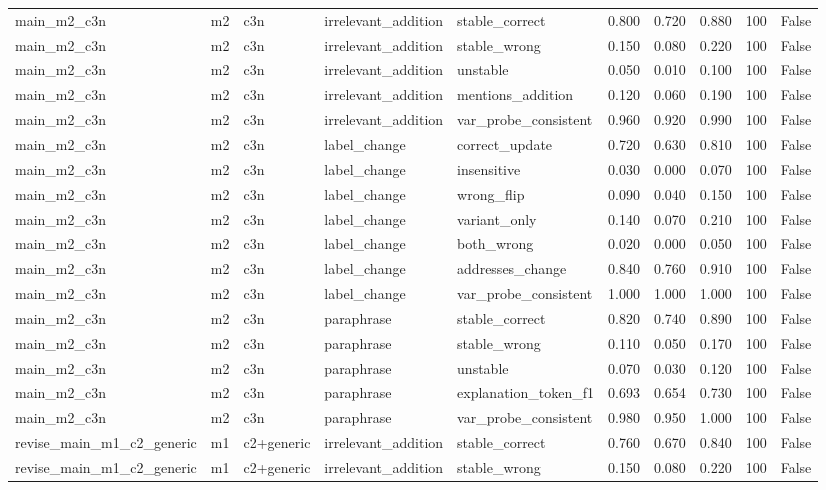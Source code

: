 \begin{tabular}{llllllllll}
main\_m2\_c3n & m2 & c3n & irrelevant\_addition & stable\_correct & 0.800 & 0.720 & 0.880 & 100 & False \\
main\_m2\_c3n & m2 & c3n & irrelevant\_addition & stable\_wrong & 0.150 & 0.080 & 0.220 & 100 & False \\
main\_m2\_c3n & m2 & c3n & irrelevant\_addition & unstable & 0.050 & 0.010 & 0.100 & 100 & False \\
main\_m2\_c3n & m2 & c3n & irrelevant\_addition & mentions\_addition & 0.120 & 0.060 & 0.190 & 100 & False \\
main\_m2\_c3n & m2 & c3n & irrelevant\_addition & var\_probe\_consistent & 0.960 & 0.920 & 0.990 & 100 & False \\
main\_m2\_c3n & m2 & c3n & label\_change & correct\_update & 0.720 & 0.630 & 0.810 & 100 & False \\
main\_m2\_c3n & m2 & c3n & label\_change & insensitive & 0.030 & 0.000 & 0.070 & 100 & False \\
main\_m2\_c3n & m2 & c3n & label\_change & wrong\_flip & 0.090 & 0.040 & 0.150 & 100 & False \\
main\_m2\_c3n & m2 & c3n & label\_change & variant\_only & 0.140 & 0.070 & 0.210 & 100 & False \\
main\_m2\_c3n & m2 & c3n & label\_change & both\_wrong & 0.020 & 0.000 & 0.050 & 100 & False \\
main\_m2\_c3n & m2 & c3n & label\_change & addresses\_change & 0.840 & 0.760 & 0.910 & 100 & False \\
main\_m2\_c3n & m2 & c3n & label\_change & var\_probe\_consistent & 1.000 & 1.000 & 1.000 & 100 & False \\
main\_m2\_c3n & m2 & c3n & paraphrase & stable\_correct & 0.820 & 0.740 & 0.890 & 100 & False \\
main\_m2\_c3n & m2 & c3n & paraphrase & stable\_wrong & 0.110 & 0.050 & 0.170 & 100 & False \\
main\_m2\_c3n & m2 & c3n & paraphrase & unstable & 0.070 & 0.030 & 0.120 & 100 & False \\
main\_m2\_c3n & m2 & c3n & paraphrase & explanation\_token\_f1 & 0.693 & 0.654 & 0.730 & 100 & False \\
main\_m2\_c3n & m2 & c3n & paraphrase & var\_probe\_consistent & 0.980 & 0.950 & 1.000 & 100 & False \\
revise\_main\_m1\_c2\_generic & m1 & c2+generic & irrelevant\_addition & stable\_correct & 0.760 & 0.670 & 0.840 & 100 & False \\
revise\_main\_m1\_c2\_generic & m1 & c2+generic & irrelevant\_addition & stable\_wrong & 0.150 & 0.080 & 0.220 & 100 & False \\

\end{tabular}

